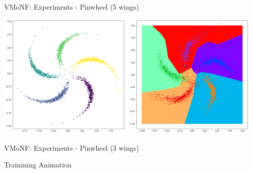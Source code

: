 \documentclass[12pt,ignorenonframetext,]{beamer}
\begin{document}
\begin{frame}{VMoNF: Experiments - Pinwheel (5 wings)}
\protect\hypertarget{vmonf-experiments---pinwheel-5-wings}{}

\centering

\includegraphics[width=0.475\textwidth]{figures/original_pinwheel.png}
\hfill
\includegraphics[width=0.475\textwidth]{figures/trained_pinwheel.png}

\end{frame}

\begin{frame}{VMoNF: Experiments - Pinwheel (3 wings)}
\protect\hypertarget{vmonf-experiments---pinwheel-3-wings}{}

Trainining Animation

\end{frame}
\end{document}
